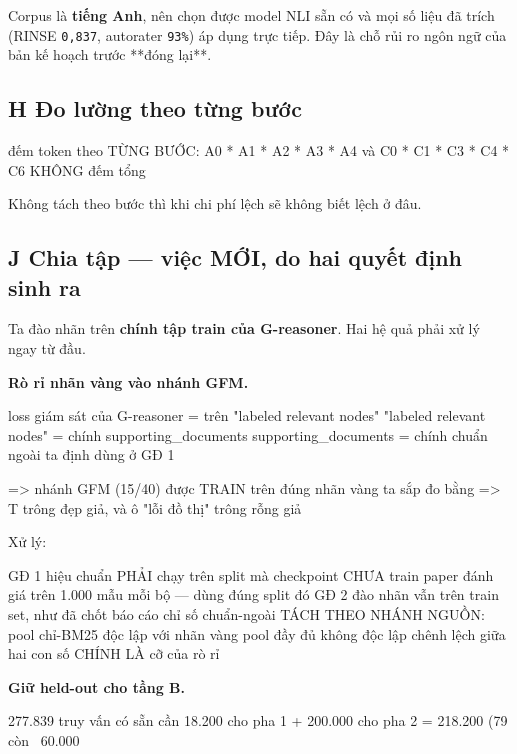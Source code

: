 \documentclass[11pt,a4paper]{article}
\begin{document}
Corpus là \textbf{tiếng Anh}, nên chọn được model NLI sẵn có và mọi số liệu đã trích (RINSE \texttt{0,837},
autorater \texttt{93\%}) áp dụng trực tiếp. Đây là chỗ rủi ro ngôn ngữ của bản kế hoạch trước **đóng
lại**.

\subsection{H Đo lường theo từng bước}

\begin{dia}
đếm token theo TỪNG BƯỚC:  A0 * A1 * A2 * A3 * A4   và   C0 * C1 * C3 * C4 * C6
KHÔNG đếm tổng
\end{dia}

Không tách theo bước thì khi chi phí lệch sẽ không biết lệch ở đâu.

\subsection{J Chia tập — việc MỚI, do hai quyết định sinh ra}

Ta đào nhãn trên \textbf{chính tập train của G-reasoner}. Hai hệ quả phải xử lý ngay từ đầu.

\textbf{Rò rỉ nhãn vàng vào nhánh GFM.}

\begin{dia}
loss giám sát của G-reasoner  =  trên "labeled relevant nodes"
"labeled relevant nodes"      =  chính supporting_documents
supporting_documents          =  chính chuẩn ngoài ta định dùng ở GĐ 1

=>  nhánh GFM (15/40) được TRAIN trên đúng nhãn vàng ta sắp đo bằng
=>  T trông đẹp giả, và ô "lỗi đồ thị" trông rỗng giả
\end{dia}

Xử lý:

\begin{dia}
GĐ 1 hiệu chuẩn   PHẢI chạy trên split mà checkpoint CHƯA train
                  paper đánh giá trên 1.000 mẫu mỗi bộ — dùng đúng split đó
GĐ 2 đào nhãn     vẫn trên train set, như đã chốt
báo cáo           chỉ số chuẩn-ngoài TÁCH THEO NHÁNH NGUỒN:
                      pool chỉ-BM25   độc lập với nhãn vàng
                      pool đầy đủ      không độc lập
                  chênh lệch giữa hai con số CHÍNH LÀ cỡ của rò rỉ
\end{dia}

\textbf{Giữ held-out cho tầng B.}

\begin{dia}
277.839 truy vấn có sẵn
cần      18.200 cho pha 1  +  200.000 cho pha 2  =  218.200   (79%
còn      ~60.000
\end{dia}
\end{document}
